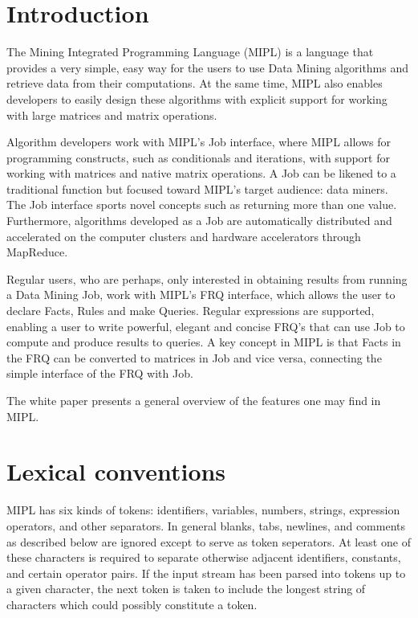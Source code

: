 \documentclass[prodmode,acmtecs]{acmsmall}
\begin{document}
\tableofcontents 

\pagebreak

\lstset{frame=single}

\section{Introduction}

The Mining Integrated Programming Language (MIPL) is a language
that provides a very simple, easy way for the users to use Data Mining
algorithms and retrieve data from their computations. At the same time, 
MIPL also enables developers to easily design these algorithms with 
explicit support for working with large matrices and matrix operations.

Algorithm developers work with MIPL's Job interface, where MIPL allows
for programming constructs, such as conditionals and iterations, with
support for working with matrices and native matrix operations. A Job can be likened to a traditional
function but focused toward MIPL's target audience: data miners. The Job 
interface sports novel concepts such as returning more than one value.
Furthermore, algorithms developed as a Job are automatically distributed 
and accelerated on the computer clusters and hardware accelerators through
MapReduce. 

Regular users, who are perhaps, only interested in obtaining results from
running a Data Mining Job, work with MIPL's FRQ interface, which allows
the user to declare Facts, Rules and make Queries. Regular expressions are
supported, enabling a user to write powerful, elegant and concise FRQ's 
that can use Job to compute and produce results to queries. A key 
concept in MIPL is that Facts in the FRQ can be converted to matrices
in Job and vice versa, connecting the simple interface of the FRQ with
Job.

The white paper presents a general overview of the features one may find
in MIPL.

\medskip

\section{Lexical conventions}
MIPL has six kinds of tokens: identifiers, variables, numbers, strings,
expression operators, and other separators.  In general blanks, tabs,
newlines, and comments as described below are ignored except to
serve as token seperators. At least one of these characters is required
to separate otherwise adjacent identifiers, constants, and certain
operator pairs.  If the input stream has been parsed into tokens up
to a given character, the next token is taken to include the longest
string of characters which could possibly constitute a token.
\end{document}
